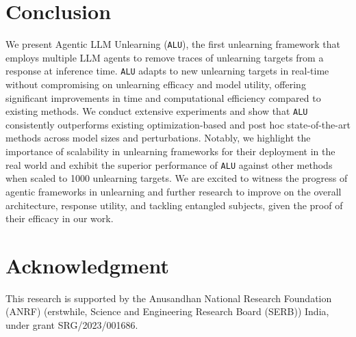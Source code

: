 \section{Conclusion}
We present Agentic LLM Unlearning (\texttt{ALU}), the first unlearning framework that employs multiple LLM agents to remove traces of unlearning targets from a response at inference time. \texttt{ALU} adapts to new unlearning targets in real-time without compromising on unlearning efficacy and model utility, offering significant improvements in time and computational efficiency compared to existing methods. We conduct extensive experiments and show that \texttt{ALU} consistently outperforms existing optimization-based and post hoc state-of-the-art methods across model sizes and perturbations. Notably, we highlight the importance of scalability in unlearning frameworks for their deployment in the real world and exhibit the superior performance of \texttt{ALU} against other methods when scaled to 1000 unlearning targets. We are excited to witness the progress of agentic frameworks in unlearning and further research to improve on the overall architecture, response utility, and tackling entangled subjects, given the proof of their efficacy in our work.

\section*{Acknowledgment}
This research is supported by the Anusandhan National Research Foundation (ANRF) (erstwhile, Science and Engineering Research Board (SERB)) India, under grant SRG/2023/001686. 
